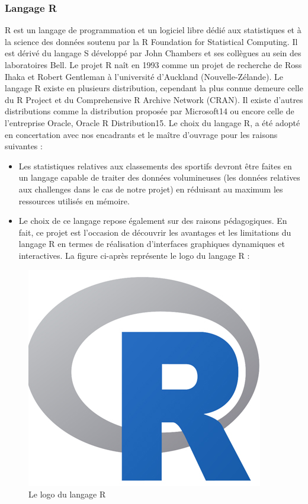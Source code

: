 \documentclass[12pt,a4paper]{report}
\begin{document}
\subsubsection {Langage R  }
R est un langage de programmation et un logiciel libre dédié aux statistiques et à la science des données soutenu par la R Foundation for Statistical Computing. Il est dérivé du langage S développé par John Chambers et ses collègues au sein des laboratoires Bell.
Le projet R naît en 1993 comme un projet de recherche de Ross Ihaka et Robert Gentleman à l'université d'Auckland (Nouvelle-Zélande). 
Le langage R existe en plusieurs distribution, cependant la plus connue demeure celle du R Project et du Comprehensive R Archive Network (CRAN). Il existe d'autres distributions comme la distribution proposée par Microsoft14 ou encore celle de l'entreprise Oracle, Oracle R Distribution15.
Le choix du langage R, a été adopté en concertation avec nos encadrants et le maître d’ouvrage pour les raisons suivantes :
\begin{itemize} 
\item Les statistiques relatives aux classements des sportifs  devront être  faites en un langage capable de traiter des données volumineuses (les données relatives aux challenges dans le cas de notre projet) en réduisant au maximum les ressources utilisés en mémoire.
\item Le choix de ce langage repose également sur des raisons pédagogiques. En fait, ce projet est l’occasion de découvrir les avantages et les limitations du langage R en termes de réalisation d’interfaces graphiques dynamiques et interactives.
La figure ci-après représente le logo du langage R :
\end{itemize} 
\begin{figure}
	  \center
	  \includegraphics[scale=0.5]{R_logo.png}
	   \caption {Le logo du langage R}
\end{figure}
\end{document}
